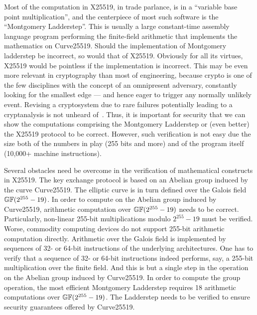 Most of the computation in X25519, in trade parlance, is in a
``variable base point multiplication'', and the centerpiece of most
such software is the ``Montgomery Ladderstep''. This is usually a
large constant-time assembly language program performing the
finite-field arithmetic that implements the mathematics on Curve25519.
Should the implementation of Montgomery ladderstep be incorrect, so
would that of X25519. Obviously for all its virtues, X25519 would be
pointless if the implementation is incorrect. This may be even more
relevant in cryptography than most of engineering, because crypto is
one of the few disciplines with the concept of an omnipresent
adversary, constantly looking for the smallest edge --- and hence
eager to trigger any normally unlikely event. Revising a cryptosystem
due to rare failures potentially leading to a cryptanalysis is not
unheard of~\cite{HNPPSSW:03:IDFSNE}.
Thus, it is important for security that we can show the computations
comprising the Montgomery Ladderstep or (even better) the X25519
protocol to be correct. However, such verification is not easy due
the size both of the numbers in play (255 bits and more) and of the
program itself (10,000+ machine instructions).

Several obstacles need be overcome in the verification of mathematical
constructs in X25519. The key exchange protocol is based on an
Abelian group induced by the curve Curve25519. The elliptic
curve is in turn defined over the Galois field $\mathbb{GF}(2^{255} - 19)$. 
In order to compute on the Abelian group induced by Curve25519,
arithmetic computation over $\mathbb{GF}(2^{255} - 19)$ needs to be
correct. Particularly, non-linear 255-bit multiplications modulo
$2^{255} - 19$ must be verified. Worse, commodity computing devices do
not support 255-bit arithmetic computation directly. Arithmetic over
the Galois field is implemented by sequences of 32- or 64-bit
instructions of the underlying architectures. One has to
verify that a sequence of 32- or 64-bit instructions indeed
performs, say, a 255-bit multiplication over the finite field. And this
is but a single step in the operation on the Abelian group induced by
Curve25519. In order to compute the group operation, 
the most efficient Montgomery Ladderstep requires 18 arithmetic 
computations over $\mathbb{GF}(2^{255} - 19)$. The Ladderstep needs to be
verified to ensure security guarantees offered by Curve25519.

